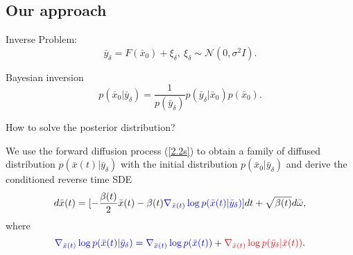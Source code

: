 \documentclass[mathserif,envcountsect,compress,8pt]{beamer}
\begin{document}
\subsection{Our approach}\label{section01}
\begin{frame}
	\setlength{\parskip}{0.6\baselineskip}
	\vspace{10pt}
	Inverse Problem:
	\begin{equation*}\label{2.1}
		\bar{y}_\delta=F(\bar{x}_0)+\xi_\delta, ~\xi_{\delta}\sim \mathcal{N}(0,\sigma^2 I).
	\end{equation*}
	
	Bayesian inversion
	\begin{equation*}\label{pd_01}
		p(\bar{x}_0|\bar{y}_{\delta})=\frac{1}{p(\bar{y}_{\delta})}p(\bar{y}_{\delta}|\bar{x}_0)p(\bar{x}_0).
	\end{equation*}
	
	{\color{green}How to solve the posterior distribution?}
	
	We use the forward diffusion process (\ref{2.2s}) to obtain a family of diffused distribution $p(\bar{x}(t)|\bar{y}_{\delta})$ with the {\color{red}initial distribution $p(\bar{x}_0|\bar{y}_{\delta})$} and  derive the {\color{red}conditioned reverse time SDE}
	\begin{equation}\label{eq7}
		d\bar{x}(t)=[-\frac{\beta(t)}{2}\bar{x}(t)-\beta(t){\color{blue}\nabla_{\bar{x}(t)}
			\log {p(\bar{x}(t)|\bar{y}_{\delta})}}]dt+\sqrt{\beta(t)}d\bar{\mathbf{\omega}},
	\end{equation}
	where
	\begin{equation}\label{eq8s}
		{\color{blue}\nabla_{\bar{x}(t)}\log p(\bar{x}(t)|\bar{y}_{\delta})=\nabla_{\bar{x}(t)}\log p(\bar{x}(t))}+{\color{red}\nabla_{\bar{x}(t)}\log p(\bar{y}_{\delta}|\bar{x}(t))}.
	\end{equation}
	
\end{frame}
\end{document}
